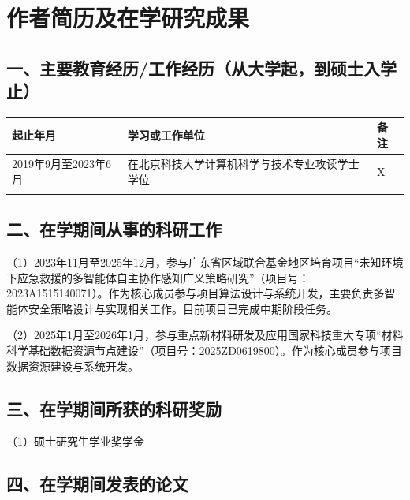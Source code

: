 \chapter*{作者简历及在学研究成果}

\section*{一、主要教育经历/工作经历（从大学起，到硕士入学止）}


\noindent\begin{tabularx}{\textwidth}{|>{\centering\arraybackslash}X|>{\centering\arraybackslash}X|>{\centering\arraybackslash}X|}
  \hline
  起止年月 & 学习或工作单位 & 备注 \\\hline 
  2019年9月至2023年6月  & 在北京科技大学计算机科学与技术专业攻读学士学位  & X  \\\hline

  & & \\ \hline
\end{tabularx}

\section*{二、在学期间从事的科研工作}


（1）2023年11月至2025年12月，参与广东省区域联合基金地区培育项目“未知环境下应急救援的多智能体自主协作感知广义策略研究”（项目号：2023A1515140071）。作为核心成员参与项目算法设计与系统开发，主要负责多智能体安全策略设计与实现相关工作。目前项目已完成中期阶段任务。

（2）2025年1月至2026年1月，参与重点新材料研发及应用国家科技重大专项“材料科学基础数据资源节点建设”（项目号：2025ZD0619800）。作为核心成员参与项目数据资源建设与系统开发。

\section*{三、在学期间所获的科研奖励}

 （1）硕士研究生学业奖学金

\section*{四、在学期间发表的论文}

